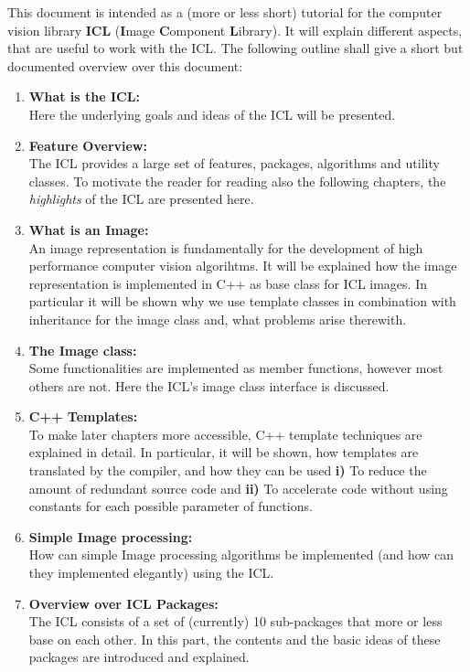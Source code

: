 %
%

This document is intended as a (more or less short) tutorial for the computer vision library \textbf{ICL} (\textbf{I}mage \textbf{C}omponent \textbf{L}ibrary). It will explain different aspects, that are useful to work with the ICL. The following outline shall give a short but documented overview over this document:

\begin{enumerate}
\item \textbf{What is the ICL:}\\ Here the underlying goals and ideas of the ICL will be presented.
\item \textbf{Feature Overview:}\\ The ICL provides a large set of features, packages, algorithms and utility classes. To motivate the reader for reading also the following chapters, the \emph{highlights} of the ICL are presented here.
\item \textbf{What is an Image:}\\ An image representation is fundamentally for the development of high performance computer vision algorihtms. It will be explained how the image representation is implemented in C++ as base class for ICL images. In particular it will be shown why we use template classes in combination with inheritance for the image class and, what problems arise therewith. 
\item \textbf{The Image class:}\\ Some functionalities are implemented as member functions, however most others are not. Here the ICL's image class interface is discussed.
\item \textbf{C++ Templates:}\\ To make later chapters more accessible, C++ template techniques are explained in detail. In particular, it will be shown, how templates are translated by the compiler, and how they can be used \small{\textbf{i)}} To reduce the amount of redundant source code and \small{\textbf{ii)}} To accelerate code without using constants for each possible parameter of functions.    
\item \textbf{Simple Image processing:}\\ How can simple Image processing algorithms be implemented (and how can they implemented elegantly) using the ICL.
\item \textbf{Overview over ICL Packages:}\\ The ICL consists of a set of (currently) 10 sub-packages that more or less base on each other. In this part, the contents and the basic ideas of these packages are introduced and explained. 

\end{enumerate}
